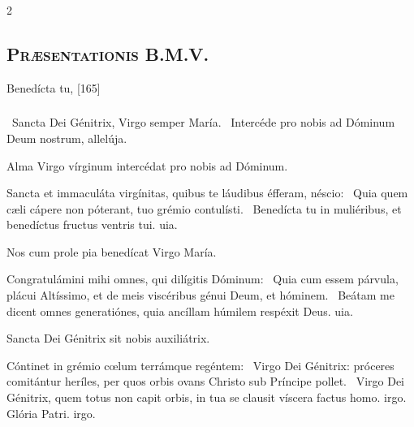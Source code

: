\documentclass[9pt,twoside]{extarticle}
\begin{document}
\begin{multicols}{2}
\subsubsection*{\center {}}
\subsection*{\center \textsc{Præsentationis B.M.V.}}

\begin{tightlist}{}
\item {} Benedícta tu,  [165]
\item {}
\item {}
\end{tightlist}

\subsubsection*{}
\begin{tightlist}{}
\item {}~Sancta Dei Génitrix, Virgo semper María. ~Intercéde pro nobis ad Dóminum Deum nostrum, allelúja.
\item {\small {} Alma Virgo vírginum intercédat pro nobis ad Dóminum.}
\item {} Sancta et immaculáta virgínitas, quibus te láudibus éfferam, néscio: \textred{*}~Quia quem cæli cápere non póterant, tuo grémio contulísti.
~Benedícta tu in muliéribus, et benedíctus fructus ventris tui. uia.
\item {\small {} Nos cum prole pia benedícat Virgo María.}
\item {} Congratulámini mihi omnes, qui dilígitis Dóminum: \textred{*}~Quia cum essem párvula, plácui Altíssimo, et de meis viscéribus génui Deum, et hóminem.
~Beátam me dicent omnes generatiónes, quia ancíllam húmilem respéxit Deus. uia.
\item {\small {} Sancta Dei Génitrix sit nobis auxiliátrix.}
\item {} Cóntinet in grémio cœlum terrámque regéntem: \textred{*}~Virgo Dei Génitrix: próceres comitántur heríles, per quos orbis ovans Christo sub Príncipe pollet.
~Virgo Dei Génitrix, quem totus non capit orbis, in tua se clausit víscera factus homo. irgo. Glória Patri. irgo.
\end{tightlist}


\end{multicols}
\end{document}
